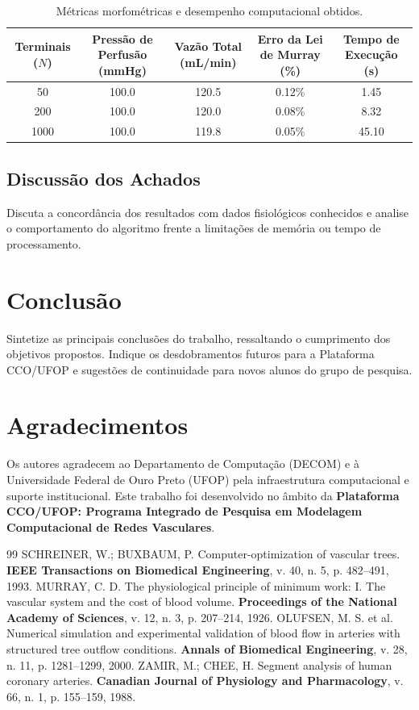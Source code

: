 \documentclass[11pt, a4paper]{article}
\begin{document}
\begin{table}[htbp]
  \centering
  \small
  \caption{Métricas morfométricas e desempenho computacional obtidos.}
  \label{tab:resultados}
  \begin{tabular}{ccccc}
    \toprule
    \textbf{Terminais ($N$)} & \textbf{Pressão de Perfusão (mmHg)} & \textbf{Vazão Total (mL/min)} & \textbf{Erro da Lei de Murray (\%)} & \textbf{Tempo de Execução (s)} \\
    \midrule
    50 & 100.0 & 120.5 & 0.12\% & 1.45 \\
    200 & 100.0 & 120.0 & 0.08\% & 8.32 \\
    1000 & 100.0 & 119.8 & 0.05\% & 45.10 \\
    \bottomrule
  \end{tabular}
\end{table}

\subsection{Discussão dos Achados}
Discuta a concordância dos resultados com dados fisiológicos conhecidos e analise o comportamento do algoritmo frente a limitações de memória ou tempo de processamento.

\section{Conclusão}
Sintetize as principais conclusões do trabalho, ressaltando o cumprimento dos objetivos propostos. Indique os desdobramentos futuros para a Plataforma CCO/UFOP e sugestões de continuidade para novos alunos do grupo de pesquisa.

\section*{Agradecimentos}
Os autores agradecem ao Departamento de Computação (DECOM) e à Universidade Federal de Ouro Preto (UFOP) pela infraestrutura computacional e suporte institucional. Este trabalho foi desenvolvido no âmbito da \textbf{Plataforma CCO/UFOP: Programa Integrado de Pesquisa em Modelagem Computacional de Redes Vasculares}.

\begin{thebibliography}{99}
   SCHREINER, W.; BUXBAUM, P. Computer-optimization of vascular trees. \textbf{IEEE Transactions on Biomedical Engineering}, v. 40, n. 5, p. 482--491, 1993.
   MURRAY, C. D. The physiological principle of minimum work: I. The vascular system and the cost of blood volume. \textbf{Proceedings of the National Academy of Sciences}, v. 12, n. 3, p. 207--214, 1926.
   OLUFSEN, M. S. et al. Numerical simulation and experimental validation of blood flow in arteries with structured tree outflow conditions. \textbf{Annals of Biomedical Engineering}, v. 28, n. 11, p. 1281--1299, 2000.
   ZAMIR, M.; CHEE, H. Segment analysis of human coronary arteries. \textbf{Canadian Journal of Physiology and Pharmacology}, v. 66, n. 1, p. 155--159, 1988.
\end{thebibliography}
\end{document}
